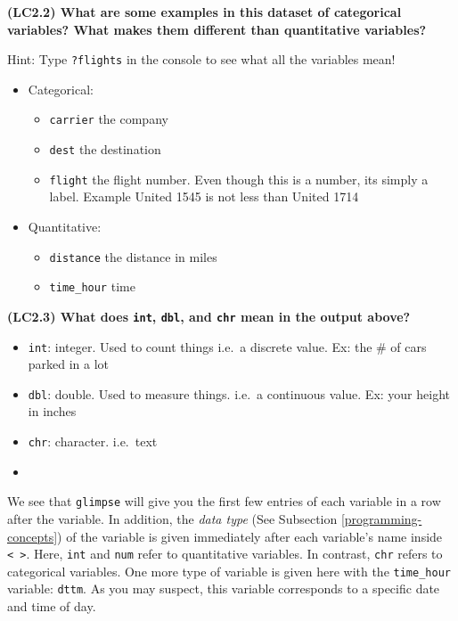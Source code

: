 \documentclass[12pt,]{krantz}
\providecommand{\tightlist}{%
  \setlength{\itemsep}{0pt}\setlength{\parskip}{0pt}}
\newenvironment{rmdblock}[1]
  {\begin{shaded*}
  \begin{itemize}
  \renewcommand{\labelitemi}{
    \raisebox{-.7\height}[0pt][0pt]{
    }
  }
  \item
  }
  {
  \end{itemize}
  \end{shaded*}
  }
\newenvironment{learncheck}
  {\begin{rmdblock}{warning}}
  {\end{rmdblock}}
\theoremstyle{definition}
\theoremstyle{definition}
\theoremstyle{definition}
\theoremstyle{remark}
\begin{document}
\textbf{(LC2.2) What are some examples in this dataset of categorical
variables? What makes them different than quantitative variables?}

Hint: Type \texttt{?flights} in the console to see what all the
variables mean!

\begin{itemize}
\tightlist
\item
  Categorical:

  \begin{itemize}
  \tightlist
  \item
    \texttt{carrier} the company
  \item
    \texttt{dest} the destination
  \item
    \texttt{flight} the flight number. Even though this is a number, its
    simply a label. Example United 1545 is not less than United 1714
  \end{itemize}
\item
  Quantitative:

  \begin{itemize}
  \tightlist
  \item
    \texttt{distance} the distance in miles
  \item
    \texttt{time\_hour} time
  \end{itemize}
\end{itemize}

\textbf{(LC2.3) What does \texttt{int}, \texttt{dbl}, and \texttt{chr}
mean in the output above?}

\begin{itemize}
\tightlist
\item
  \texttt{int}: integer. Used to count things i.e.~a discrete value. Ex:
  the \# of cars parked in a lot
\item
  \texttt{dbl}: double. Used to measure things. i.e.~a continuous value.
  Ex: your height in inches
\item
  \texttt{chr}: character. i.e.~text
\end{itemize}

\begin{learncheck}

\end{learncheck}

We see that \texttt{glimpse} will give you the first few entries of each
variable in a row after the variable. In addition, the \emph{data type}
(See Subsection \ref{programming-concepts}) of the variable is given
immediately after each variable's name inside
\texttt{\textless{}\ \textgreater{}}. Here, \texttt{int} and
\texttt{num} refer to quantitative variables. In contrast, \texttt{chr}
refers to categorical variables. One more type of variable is given here
with the \texttt{time\_hour} variable: \texttt{dttm}. As you may
suspect, this variable corresponds to a specific date and time of day.
\end{document}
